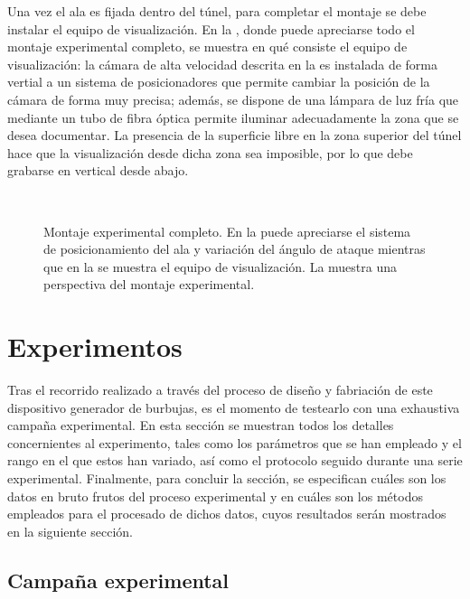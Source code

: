 Una vez el ala es fijada dentro del túnel, para completar el montaje se debe instalar el equipo de visualización. En la , donde puede apreciarse todo el montaje experimental completo, se muestra en qué consiste el equipo de visualización: la cámara de alta velocidad descrita en la  es instalada de forma vertial a un sistema de posicionadores que permite cambiar la posición de la cámara de forma muy precisa; además, se dispone de una lámpara de luz fría que mediante un tubo de fibra óptica permite iluminar adecuadamente la zona que se desea documentar. La presencia de la superficie libre en la zona superior del túnel hace que la visualización desde dicha zona sea imposible, por lo que debe grabarse en vertical desde abajo. 


\begin{figure}
\centering
{}
 \\
\caption{Montaje experimental completo. En la  puede apreciarse el sistema de posicionamiento del ala y variación del ángulo de ataque mientras que en la  se muestra el equipo de visualización. La  muestra una perspectiva del montaje experimental.}
\end{figure}


\section{Experimentos}

Tras el recorrido realizado a través del proceso de diseño y fabriación de este dispositivo generador de burbujas, es el momento de testearlo con una exhaustiva campaña experimental. En esta sección se muestran todos los detalles concernientes al experimento, tales como los parámetros que se han empleado y el rango en el que estos han variado, así como el protocolo seguido durante una serie experimental. Finalmente, para concluir la sección, se especifican cuáles son los datos en bruto frutos del proceso experimental y en cuáles son los métodos empleados para el procesado de dichos datos, cuyos resultados serán mostrados en la siguiente sección. 

\subsection{Campaña experimental}

